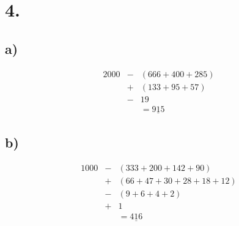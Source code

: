 \documentclass[a4paper]{scrartcl}
\begin{document}
\newpage
\section{4.}
	\subsection{a)}
		\[
		\begin{array}{rcl}
		2000&-& (666+400+285) \\
		&+& (133+95+57) \\
		&-& 19 \\
		&&= \underline{915}	
		\end{array}
		\]	
	
	\subsection{b)}
		\[
		\begin{array}{rcl}
		1000&-& (333+200+142+90) \\
		&+& (66+47+30+28+18+12) \\
		&-& (9+6+4+2) \\
		&+& 1 \\
		&&=\underline{416}
		\end{array}
		\]

	
\end{document}
